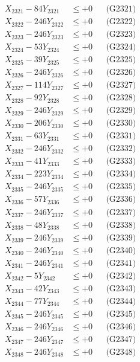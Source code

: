 \documentclass[a4paper,10pt]{article}
\begin{document}
{\begin{align}
\allowbreak
X_{2321} - 84Y_{2321} &\leq +0 && \text{(G2321)} \\
X_{2322} - 246Y_{2322} &\leq +0 && \text{(G2322)} \\
X_{2323} - 246Y_{2323} &\leq +0 && \text{(G2323)} \\
X_{2324} - 53Y_{2324} &\leq +0 && \text{(G2324)} \\
X_{2325} - 39Y_{2325} &\leq +0 && \text{(G2325)} \\
X_{2326} - 246Y_{2326} &\leq +0 && \text{(G2326)} \\
X_{2327} - 114Y_{2327} &\leq +0 && \text{(G2327)} \\
X_{2328} - 92Y_{2328} &\leq +0 && \text{(G2328)} \\
X_{2329} - 246Y_{2329} &\leq +0 && \text{(G2329)} \\
X_{2330} - 206Y_{2330} &\leq +0 && \text{(G2330)} \\
\allowbreak
X_{2331} - 63Y_{2331} &\leq +0 && \text{(G2331)} \\
X_{2332} - 246Y_{2332} &\leq +0 && \text{(G2332)} \\
X_{2333} - 41Y_{2333} &\leq +0 && \text{(G2333)} \\
X_{2334} - 223Y_{2334} &\leq +0 && \text{(G2334)} \\
X_{2335} - 246Y_{2335} &\leq +0 && \text{(G2335)} \\
X_{2336} - 57Y_{2336} &\leq +0 && \text{(G2336)} \\
X_{2337} - 246Y_{2337} &\leq +0 && \text{(G2337)} \\
X_{2338} - 48Y_{2338} &\leq +0 && \text{(G2338)} \\
X_{2339} - 246Y_{2339} &\leq +0 && \text{(G2339)} \\
X_{2340} - 246Y_{2340} &\leq +0 && \text{(G2340)} \\
\allowbreak
X_{2341} - 246Y_{2341} &\leq +0 && \text{(G2341)} \\
X_{2342} - 5Y_{2342} &\leq +0 && \text{(G2342)} \\
X_{2343} - 42Y_{2343} &\leq +0 && \text{(G2343)} \\
X_{2344} - 77Y_{2344} &\leq +0 && \text{(G2344)} \\
X_{2345} - 246Y_{2345} &\leq +0 && \text{(G2345)} \\
X_{2346} - 246Y_{2346} &\leq +0 && \text{(G2346)} \\
X_{2347} - 246Y_{2347} &\leq +0 && \text{(G2347)} \\
X_{2348} - 246Y_{2348} &\leq +0 && \text{(G2348)} \\

\end{align}}
\end{document}
